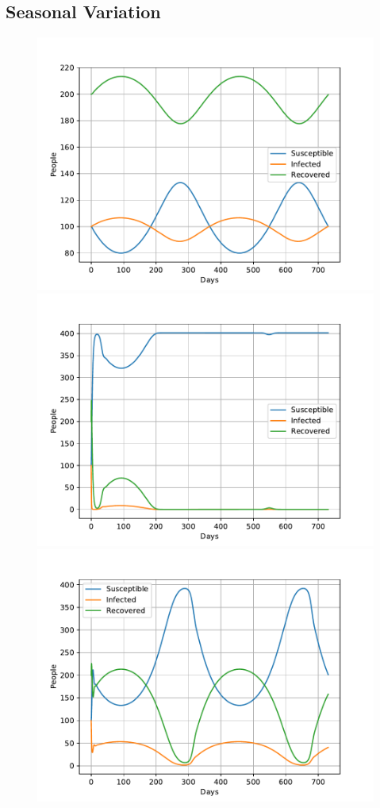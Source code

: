 \documentclass[a4paper]{article}
\let\Oldsubsection\subsection
\renewcommand{\subsection}{\FloatBarrier\Oldsubsection}
\begin{document}
\subsection{Seasonal Variation}

\begin{figure}[!htb]
	\centering 
	\includegraphics[scale=0.56]{../plots/opp_d_A.pdf}
	\includegraphics[scale=0.56]{../plots/opp_d_B.pdf}	
	\includegraphics[scale=0.56]{../plots/opp_d_C.pdf}

\end{figure}
\end{document}
